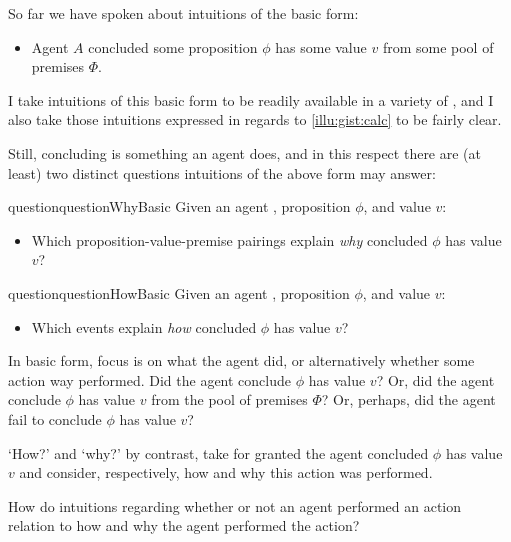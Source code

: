 \begin{note}
  So far we have spoken about intuitions of the basic form:

  \begin{itemize}
  \item
    Agent \(A\) concluded some proposition \(\phi\) has some value \(v\) from some pool of premises \(\Phi\).
  \end{itemize}

  I take intuitions of this basic form to be readily available in a variety of , and I also take those intuitions expressed in regards to \autoref{illu:gist:calc} to be fairly clear.

  Still, concluding is something an agent does, and in this respect there are (at least) two distinct questions intuitions of the above form may answer:%

  \begin{restatable}[\qWhy{}]{question}{questionWhyBasic}
    \label{q:why}
    Given an agent \vAgent{}, proposition \(\phi\), and value \(v\):

    \begin{itemize}
    \item
      Which proposition-value-premise pairings explain \emph{why} \vAgent{} concluded \(\phi\) has value \(v\)?
    \end{itemize}
    \vspace{-\baselineskip}
  \end{restatable}

  \begin{restatable}[\qHow{}]{question}{questionHowBasic}
    \label{q:how}
    Given an agent \vAgent{}, proposition \(\phi\), and value \(v\):

    \begin{itemize}
    \item
      Which events explain \emph{how} \vAgent{} concluded \(\phi\) has value \(v\)?
    \end{itemize}
    \vspace{-\baselineskip}
  \end{restatable}

  In basic form, focus is on what the agent did, or alternatively whether some action way performed.
  Did the agent conclude \(\phi\) has value \(v\)?
  Or, did the agent conclude \(\phi\) has value \(v\) from the pool of premises \(\Phi\)?
  Or, perhaps, did the agent fail to conclude \(\phi\) has value \(v\)?

  `How?' and `why?' by contrast, take for granted the agent concluded \(\phi\) has value \(v\) and consider, respectively, how and why this action was performed.

  How do intuitions regarding whether or not an agent performed an action relation to how and why the agent performed the action?
\end{note}

